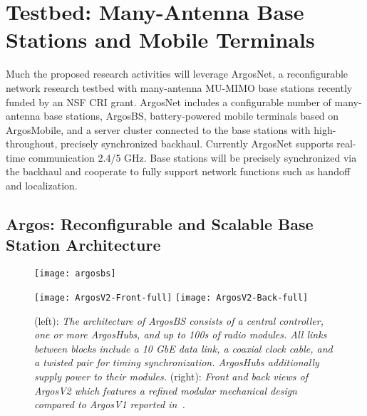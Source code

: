 
\section{Testbed: Many-Antenna Base Stations and Mobile Terminals}\label{sec:testbed}

Much the proposed research activities will leverage ArgosNet, a reconfigurable network research testbed with many-antenna MU-MIMO base stations recently funded by an NSF CRI grant.  
ArgosNet includes a configurable number of many-antenna base stations, ArgosBS, battery-powered mobile terminals based on ArgosMobile, and a server cluster connected to the base stations with high-throughout, precisely synchronized backhaul.  Currently ArgosNet supports real-time communication 2.4/5 GHz. Base stations will be precisely synchronized via the backhaul and cooperate to fully support network functions such as handoff and localization. 


\subsection{Argos: Reconfigurable and Scalable Base Station Architecture}\label{sec:argosv2}

\begin{figure*}[t]
\centering
\begin{minipage}[c]{0.62\textwidth}
\centering
 \texttt{[image: argosbs]}
\end{minipage}
\hspace{2mm}
  \begin{minipage}[c]{0.34\textwidth}
  \centering
 \texttt{[image: ArgosV2-Front-full]}
 \texttt{[image: ArgosV2-Back-full]}
 \end{minipage}
		\vspace{-2mm}
\caption{(left): \emph{The architecture of ArgosBS consists of a central controller, one or more ArgosHubs, and up to 100s of radio modules. 
			All links between blocks include a 10 GbE data link, a coaxial clock cable, and a twisted pair for timing synchronization. 
			ArgosHubs additionally supply power to their modules.} (right): \emph{Front and back views of ArgosV2 which features a refined modular mechanical design compared to ArgosV1 reported in~\cite{shepard2012mobicom}.} }
		\vspace{-2mm}
\label{fig:ArgosV2}
\end{figure*}

